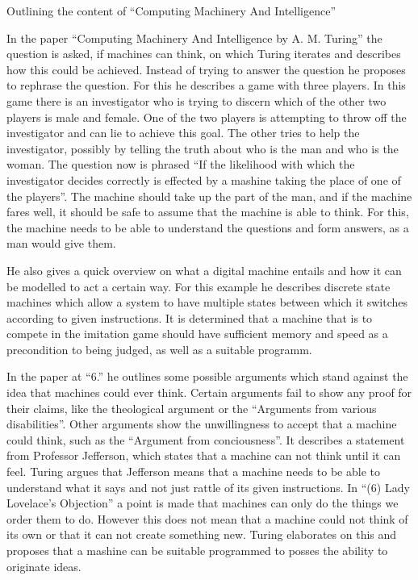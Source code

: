 \documentclass[12pt,a4paper]{article}
\author{Jonas Harlacher}
\begin{document}
{
\begin{center}
\begin{Large}
Outlining the content of ``Computing Machinery And Intelligence''
\end{Large}
\end{center}
In the paper ``Computing Machinery And Intelligence by A. M. Turing'' the question is asked, if machines can think, on which Turing iterates and describes how this could be achieved.
Instead of trying to answer the question he proposes to rephrase the question.
For this he describes a game with three players.
In this game there is an investigator who is trying to discern which of the other two players is male and female.
One of the two players is attempting to throw off the investigator and can lie to achieve this goal.
The other tries to help the investigator, possibly by telling the truth about who is the man and who is the woman.
The question now is phrased ``If the likelihood with which the investigator decides correctly is effected by a mashine taking the place of one of the players''.
The machine should take up the part of the man, and if the machine fares well, it should be safe to assume that the machine is able to think.
For this, the machine needs to be able to understand the questions and form answers, as a man would give them.

He also gives a quick overview on what a digital machine entails and how it can be modelled to act a certain way.
For this example he describes discrete state machines which allow a system to have multiple states between which it switches according to given instructions.
It is determined that a machine that is to compete in the imitation game should have sufficient memory and speed as a precondition to being judged, as well as a suitable programm.

In the paper at ``6.'' he outlines some possible arguments which stand against the idea that machines could ever think.
Certain arguments fail to show any proof for their claims, like the theological argument or the ``Arguments from various disabilities''.
Other arguments show the unwillingness to accept that a machine could think, such as the ``Argument from conciousness''.
It describes a statement from Professor Jefferson, which states that a machine can not think until it can feel.
Turing argues that Jefferson means that a machine needs to be able to understand what it says and not just rattle of its given instructions.
In ``(6) Lady Lovelace’s Objection'' a point is made that machines can only do the things we order them to do.
However this does not mean that a machine could not think of its own or that it can not create something new.
Turing elaborates on this and proposes that a mashine can be suitable programmed to posses the ability to originate ideas.

}
\end{document}
